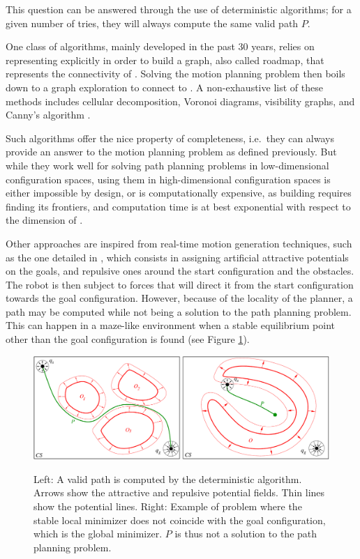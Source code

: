 This question can be answered through the use of deterministic
algorithms; for a given number of tries, they will always compute the
same valid path $P$.

One class of algorithms, mainly developed in the past 30 years, relies
on representing {\cobs} explicitly in order to build a graph, also
called roadmap, that represents the connectivity of {\cfree}. Solving
the motion planning problem then boils down to a graph exploration to
connect  to . A non-exhaustive list of these
methods includes cellular decomposition, Voronoi diagrams, visibility
graphs, and Canny's algorithm \cite{good04}.

Such algorithms offer the nice property of completeness, i.e.\ they can
always provide an answer to the motion planning problem as defined
previously. But while they work well for solving path planning
problems in low-dimensional configuration spaces, using them in
high-dimensional configuration spaces is either impossible by design,
or is computationally expensive, as building {\cfree} requires finding
its frontiers, and computation time is at best exponential with
respect to the dimension of {\cspace}.

Other approaches are inspired from real-time motion generation
techniques, such as the one detailed in \cite{khat85}, which consists
in assigning artificial attractive potentials on the goals, and
repulsive ones around the start configuration and the obstacles. The
robot is then subject to forces that will direct it from the start
configuration towards the goal configuration. However, because of the
locality of the planner, a path may be computed while not being a
solution to the path planning problem. This can happen in a maze-like
environment when a stable equilibrium point other than the goal
configuration is found (see Figure
\ref{fig:chap1-deterministic-algorithm}).

\begin{figure}
  \centering
      {\includegraphics[width = \linewidth]
        {src/chap1-path-optimization/deterministic-algorithm.pdf}}
      \caption{Left: A valid path is computed by the deterministic
        algorithm. Arrows show the attractive and repulsive potential
        fields. Thin lines show the potential lines. Right: Example of
        problem where the stable local minimizer does not coincide
        with the goal configuration, which is the global
        minimizer. $P$ is thus not a solution to the path planning
        problem.}
      \label{fig:chap1-deterministic-algorithm}
\end{figure}

